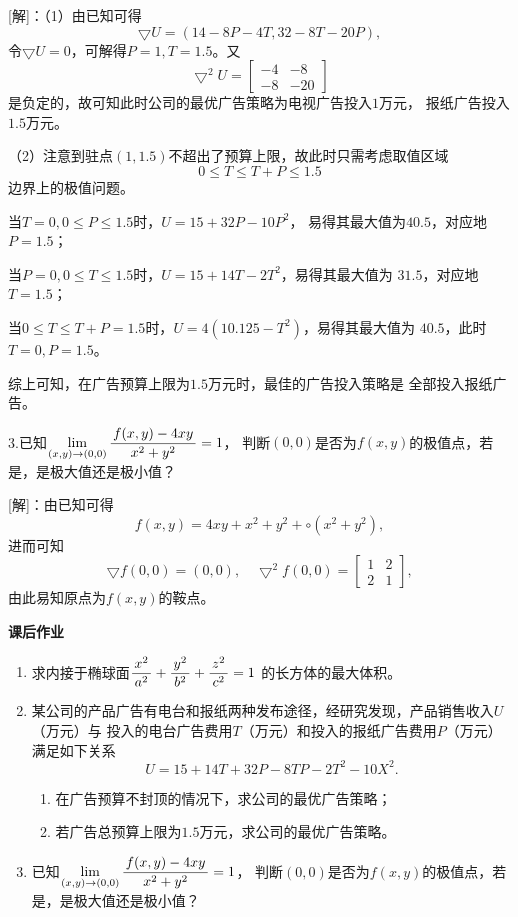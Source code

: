[解]：（1）由已知可得
$$\bigtriangledown U=(14-8P-4T,32-8T-20P),$$
令$\bigtriangledown U=0$，可解得$P=1,T=1.5$。又
$$\bigtriangledown^2U=\left[\begin{array}{cc}
	-4 & -8 \\ -8 & -20
\end{array}\right]$$
是负定的，故可知此时公司的最优广告策略为电视广告投入$1$万元，
报纸广告投入$1.5$万元。

（2）注意到驻点$(1,1.5)$不超出了预算上限，故此时只需考虑取值区域
$$0\leq T\leq T+P\leq 1.5$$
边界上的极值问题。

当$T=0,0\leq P\leq 1.5$时，$U=15+32P-10P^2$，
易得其最大值为$40.5$，对应地$P=1.5$；

当$P=0,0\leq T\leq 1.5$时，$U=15+14T-2T^2$，易得其最大值为
$31.5$，对应地$T=1.5$；

当$0\leq T\leq T+P=1.5$时，$U=4(10.125-T^2)$，易得其最大值为
$40.5$，此时$T=0,P=1.5$。

综上可知，在广告预算上限为$1.5$万元时，最佳的广告投入策略是
全部投入报纸广告。\fin

\bs

3.已知$\lim\limits_{(x,y)\to(0,0)}\displaystyle\frac{\,{f(x,y)-4xy}\,}{\,{x^2+y^2}\,}=1$，
判断$(0,0)$是否为$f(x,y)$的极值点，若是，是极大值还是极小值？

[解]：由已知可得
$$f(x,y)=4xy+x^2+y^2+\circ(x^2+y^2),$$
进而可知
$$\bigtriangledown f(0,0)=(0,0),\quad
\bigtriangledown^2f(0,0)=\left[\begin{array}{cc}
	1 & 2 \\ 2 & 1
\end{array}\right],$$
由此易知原点为$f(x,y)$的鞍点。\fin

\begin{ext}
	{\bf 课后作业}
	\begin{enumerate}
	  \item 求内接于椭球面$\displaystyle\frac{\,{x^2}\,}{\,{a^2}\,}+\displaystyle\frac{\,{y^2}\,}{\,{b^2}\,}+\displaystyle\frac{\,{z^2}\,}{\,{c^2}\,}=1$
	  的长方体的最大体积。
	  \item 某公司的产品广告有电台和报纸两种发布途径，经研究发现，产品销售收入$U$（万元）与
	  投入的电台广告费用$T$（万元）和投入的报纸广告费用$P$（万元）满足如下关系
	  $$U=15+14T+32P-8TP-2T^2-10X^2.$$
	  \begin{enumerate}[(1)]
	    \item 在广告预算不封顶的情况下，求公司的最优广告策略；
	    \item 若广告总预算上限为$1.5$万元，求公司的最优广告策略。
	  \end{enumerate}
	  \item 已知$\lim\limits_{(x,y)\to(0,0)}\displaystyle\frac{\,{f(x,y)-4xy}\,}{\,{x^2+y^2}\,}=1$，
	  判断$(0,0)$是否为$f(x,y)$的极值点，若是，是极大值还是极小值？
	\end{enumerate}
\end{ext}